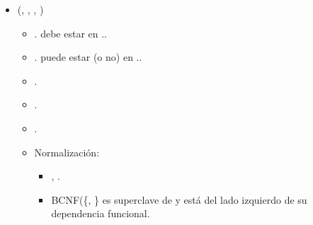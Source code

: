 \begin{itemize}
        \item {}(, , 
            , )
            \begin{itemize}
                \item {}. debe estar en 
                    ..
                \item {}. puede estar (o no) en 
                    ..
                \item {}.
                \item {}.
                \item {}.
                \item Normalización:
                    \begin{itemize}
                        \item {}
                            {, }.
                        \item BCNF(\{, \} es
                            superclave de  y está del lado izquierdo
                            de su dependencia funcional.
                    \end{itemize}
            \end{itemize}



\end{itemize}
